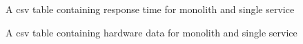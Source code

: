 A csv table containing response time for monolith and single service

A csv table containing hardware data for monolith and single service